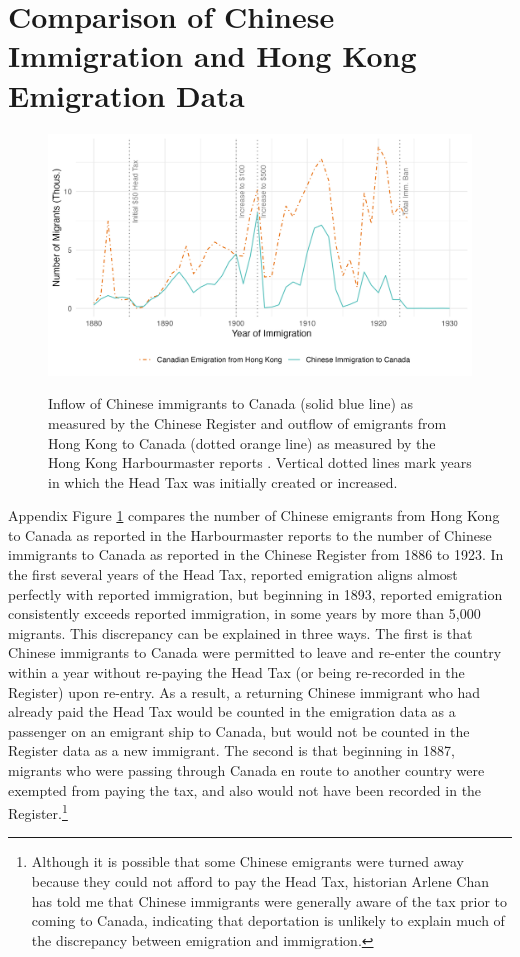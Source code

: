 \section{Comparison of Chinese Immigration and Hong Kong Emigration Data}
\begin{figure}[!h]
    \centering 
    \caption{Inflow of Chinese immigrants to Canada (solid blue line) as measured by the Chinese Register \citep{chineseregister} and outflow of emigrants from Hong Kong to Canada (dotted orange line) as measured by the Hong Kong Harbourmaster reports \citep{hkharbourmaster}. Vertical dotted lines mark years in which the Head Tax was initially created or increased.}
    \includegraphics[width=\textwidth]{../../figs/fig2_flow_immandem.png}
    \label{fig:immandem}
\end{figure}
Appendix Figure \ref{fig:immandem} compares the number of Chinese emigrants from Hong Kong to Canada as reported in the Harbourmaster reports to the number of Chinese immigrants to Canada as reported in the Chinese Register from 1886 to 1923. In the first several years of the Head Tax, reported emigration aligns almost perfectly with reported immigration, but beginning in 1893, reported emigration consistently exceeds reported immigration, in some years by more than 5,000 migrants. 
This discrepancy can be explained in three ways. 
The first is that Chinese immigrants to Canada were permitted to leave and re-enter the country within a year without re-paying the Head Tax (or being re-recorded in the Register) upon re-entry. As a result, a returning Chinese immigrant who had already paid the Head Tax would be counted in the emigration data as a passenger on an emigrant ship to Canada, but would not be counted in the Register data as a new immigrant. 
The second is that beginning in 1887, migrants who were passing through Canada en route to another country were exempted from paying the tax, and also would not have been recorded in the Register.\footnote{Although it is possible that some Chinese emigrants were turned away because they could not afford to pay the Head Tax, historian Arlene Chan has told me that Chinese immigrants were generally aware of the tax prior to coming to Canada, indicating that deportation is unlikely to explain much of the discrepancy between emigration and immigration.}
